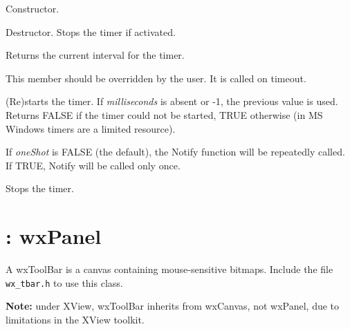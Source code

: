 

Constructor.



Destructor. Stops the timer if activated.



Returns the current interval for the timer.



This member should be overridden by the user. It is called on timeout.



(Re)starts the timer. If {\it milliseconds}\/ is absent or -1, the
previous value is used. Returns FALSE if the timer could not be started,
TRUE otherwise (in MS Windows timers are a limited resource).

If {\it oneShot} is FALSE (the default), the Notify function will be repeatedly
called. If TRUE, Notify will be called only once.



Stops the timer.

\section{: wxPanel}\label{wxtoolbar}


A wxToolBar is a canvas containing mouse-sensitive bitmaps.
Include the file {\tt wx\_tbar.h} to use this class.

{\bf Note:} under XView, wxToolBar inherits from wxCanvas, not wxPanel, due to limitations
in the XView toolkit.



